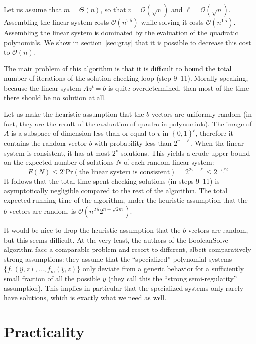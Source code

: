 \documentclass[twoside,leqno]{article}
\newcommand{\bits}{\left\{0, 1\right\}}
\newcommand{\bigO}[1]{\ensuremath{\mathcal{O}\left( #1 \right)} }
\newcommand{\bigTheta}[1]{\ensuremath{\Theta\left( #1 \right)} }
\begin{document}
Let us assume that $m = \bigTheta{n}$, so that $v = \bigO{\sqrt{n}}$ and
$\ell = \bigO{\sqrt{n}}$. Assembling the linear system costs $\bigO{n^{2.5}}$
while solving it costs $\bigO{n^{1.5}}$. Assembling the linear system is
dominated by the evaluation of the quadratic polynomials. We show in
section~\ref{sec:gray} that it is possible to decrease this cost to $\bigO{n}$.

The main problem of this algorithm is that it is difficult to bound the total
number of iterations of the solution-checking loop (step 9--11). Morally
speaking, because the linear system $A z^t = b$ is quite overdetermined, then most
of the time there should be no solution at all.

Let us make the heuristic assumption that the $b$ vectors are uniformly random
(in fact, they are the result of the evaluation of quadratic polynomials). The
image of $A$ is a subspace of dimension less than or equal to $v$ in
$\bits^\ell$, therefore it contains the random vector $b$ with probability less
than $2^{v-\ell}$. When the linear system is consistent, it has at most $2^v$
solutions. This yields a crude upper-bound on the expected number of solutions
$N$ of each random linear system:
\[
E(N) \leq 2^v \mathrm{Pr}(\text{the linear system is consistent}) = 2^{2v - \ell} \leq 2^{-v/2}
\]
It follows that the total time spent checking solutions (in steps 9--11) is
asymptotically negligible compared to the rest of the algorithm.  The total
expected running time of the algorithm, under the heuristic assumption that the
$b$ vectors are random, is $\bigO{n^{2.5} 2^{n - \sqrt{2m}}}$.

It would be nice to drop the heuristic assumption that the $b$ vectors are
random, but this seems difficult. At the very least, the authors of the
\textsf{BooleanSolve} algorithm face a comparable problem and resort to
different, albeit comparatively strong assumptions: they assume that the
``specialized'' polynomial systems $\{f_1(\hat y, z), \dots, f_m(\hat y, z)\}$
only deviate from a generic behavior for a sufficiently small fraction of all
the possible $\hat y$ (they call this the ``strong semi-regularity''
assumption). This implies in particular that the specialized systems only rarely
have solutions, which is exactly what we need as well.



\section{Practicality}
\end{document}
